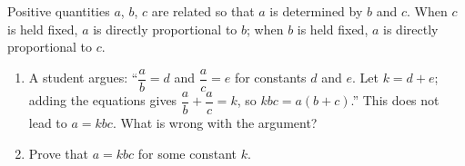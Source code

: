 Positive quantities $a$, $b$, $c$ are related so that $a$ is determined by $b$ and $c$. When $c$ is held fixed, $a$ is directly proportional to $b$; when $b$ is held fixed, $a$ is directly proportional to $c$.
\begin{enumerate}
\item[(a)] A student argues: ``$\dfrac ab=d$ and $\dfrac ac=e$ for constants $d$ and $e$. Let $k=d+e$; adding the equations gives $\dfrac ab+\dfrac ac=k$, so $kbc=a(b+c)$.'' This does not lead to $a=kbc$. What is wrong with the argument?
\item[(b)] Prove that $a=kbc$ for some constant $k$.
\end{enumerate}
